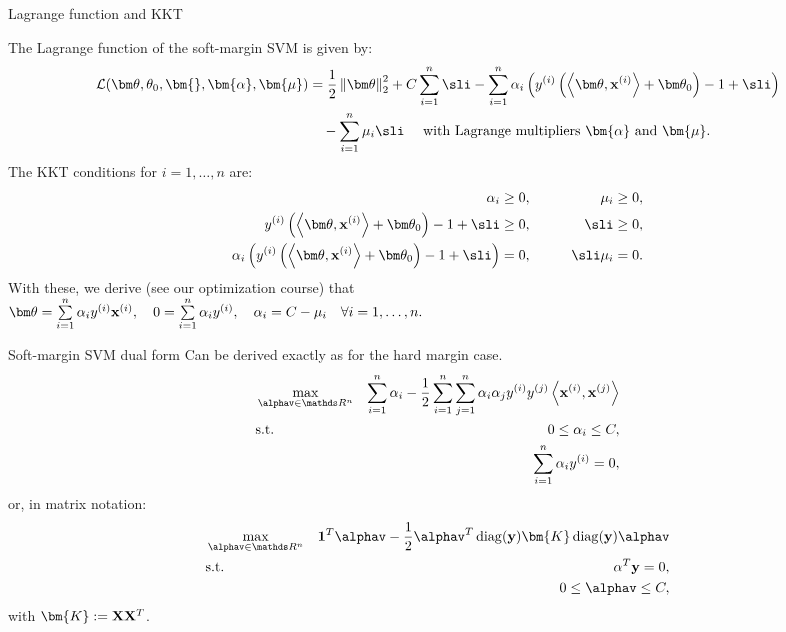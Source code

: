 \documentclass[11pt,compress,t,notes=noshow, xcolor=table]{beamer}
\begin{document}
\begin{vbframe}{Lagrange function and KKT}

\small
The Lagrange function of the soft-margin SVM is given by:
\begin{align*}
    \mathcal{L}(\thetav, \theta_0, \bm{\sl}, \bm{\alpha}, \bm{\mu}) &= \frac{1}{2}\left\Vert\thetav\right\Vert^2_2 + C\sumin\sli - \sumin \alpha_i\left(\yi \left( \scp{\thetav}{\xi} + \thetav_0 \right) -1 + \sli\right) \\
    & \quad - \sumin \mu_i\sli \quad\text{ with Lagrange multipliers $\bm{\alpha}$ and $\bm{\mu}.$}
\end{align*}
The KKT conditions for $i=1,\dots, n$ are:
\begin{eqnarray*}
    \alpha_i \geq 0, &\quad\quad&\mu_i \geq 0, \\
    \yi \left( \scp{\thetav}{\xi} + \thetav_0 \right) -1 + \sli \geq 0, && \sli \geq 0, \\
    \alpha_i\left(\yi \left( \scp{\thetav}{\xi} + \thetav_0 \right) -1 + \sli\right)  = 0, && \sli\mu_i = 0.
\end{eqnarray*} 
With these, we derive (see our optimization course) that \\
$\thetav = \sumin \alpha_i\yi\xi, \quad 0 = \sumin\alpha_i\yi, \quad \alpha_i = C - \mu_i\quad \forall i=1,\dots, n.$
\end{vbframe}

\begin{vbframe}{Soft-margin SVM dual form}
Can be derived exactly as for the hard margin case.
\begin{eqnarray*}
    & \max\limits_{\alphav \in \R^n} & \sum_{i=1}^n \alpha_i - \frac{1}{2}\sum_{i=1}^n\sum_{j=1}^n\alpha_i\alpha_j\yi y^{(j)} \scp{\xi}{\xv^{(j)}} \\
    & \text{s.t. } & 0 \le \alpha_i \le C, \\
    & \quad & \sum_{i=1}^n \alpha_i \yi = 0,
\end{eqnarray*}
or, in matrix notation:
\begin{eqnarray*}
  & \max\limits_{\alphav \in \R^n} &  \one^T \alphav - \frac{1}{2} \alphav^T \diag(\yv) \bm{K} \diag(\yv) \alphav \\
  & \text{s.t.} & \alpha^T \yv = 0, \\
  &  & 0 \leq \alphav \leq C,
\end{eqnarray*}
with $\bm{K}:=\Xmat \Xmat^T$.
\end{vbframe}
\end{document}
